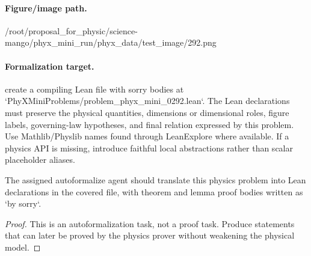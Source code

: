 \paragraph{Figure/image path.}
/root/proposal\_for\_physic/science-mango/phyx\_mini\_run/phyx\_data/test\_image/292.png

\paragraph{Formalization target.}
create a compiling Lean file with sorry bodies at `PhyXMiniProblems/problem\_phyx\_mini\_0292.lean`. The Lean declarations must preserve the physical quantities, dimensions or dimensional roles, figure labels, governing-law hypotheses, and final relation expressed by this problem.
Use Mathlib/Physlib names found through LeanExplore where available. If a physics API is missing, introduce faithful local abstractions rather than scalar placeholder aliases.

\begin{theorem}
\label{thm:physics:phyx_mini_0292:target}
The assigned autoformalize agent should translate this physics problem into Lean declarations in the covered file, with theorem and lemma proof bodies written as `by sorry`.
\end{theorem}
\begin{proof}
This is an autoformalization task, not a proof task. Produce statements that can later be proved by the physics prover without weakening the physical model.
\end{proof}

